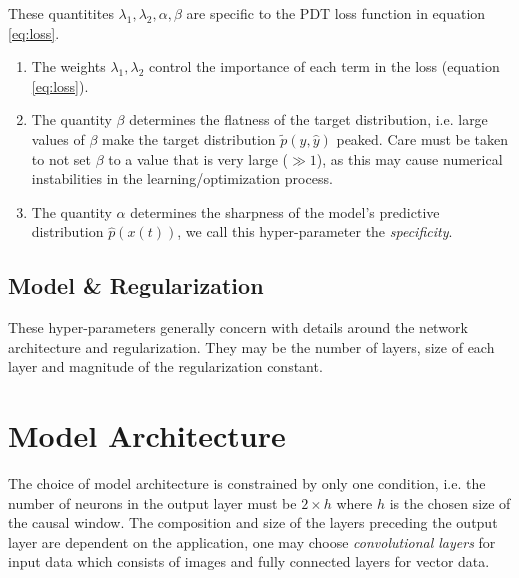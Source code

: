 \documentclass[envcountsect,runningheads]{llncs}
\theoremstyle{etoile}
\begin{document}
These quantitites $\lambda_1, \lambda_2, \alpha, \beta$ are specific to the PDT loss function in equation 
\ref{eq:loss}. 

\begin{enumerate}
\item The weights $\lambda_1, \lambda_2$ control the importance of each term in the loss (equation \ref{eq:loss}).
\item The quantity $\beta$ determines the flatness of the target distribution, i.e. large values of $\beta$ 
      make the target distribution $\tilde{p}(y, \hat{y})$ peaked. Care must be taken to not set $\beta$ to a value
      that is very large ($\gg 1$), as this may cause numerical instabilities in the learning/optimization process.
\item The quantity $\alpha$ determines the sharpness of the model's predictive distribution $\hat{p}(x(t))$, 
      we call this hyper-parameter the \emph{specificity}.        
\end{enumerate}
 

\subsection{Model \& Regularization}

These hyper-parameters generally concern with details around the network architecture and 
regularization. They may be the number of layers, size of each layer and magnitude of the 
regularization constant.



\section{Model Architecture}

The choice of model architecture is constrained by only one condition, i.e. the number of neurons 
in the output layer must be $2 \times h$ where $h$ is the chosen size of the causal window. 
The composition and size of the layers preceding the output layer are dependent on the application, 
one may choose \emph{convolutional layers} for input data which consists of images and fully connected 
layers for vector data.

\end{document}
